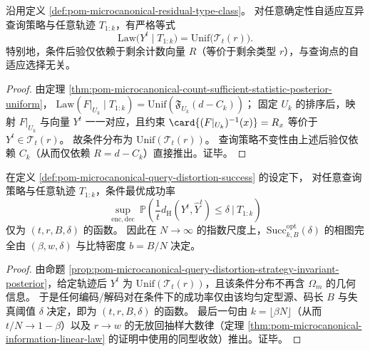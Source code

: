 \begin{proposition}\label{prop:pom-microcanonical-query-distortion-strategy-invariant-posterior}
沿用定义 \ref{def:pom-microcanonical-residual-type-class}。
对任意确定性自适应互异查询策略与任意轨迹 \(T_{1:k}\)，有严格等式
\[
\mathrm{Law}\bigl(Y^t\mid T_{1:k}\bigr)=\mathrm{Unif}\bigl(\mathcal{T}_t(r)\bigr).
\]
特别地，条件后验仅依赖于剩余计数向量 \(R\)（等价于剩余类型 \(r\)），与查询点的自适应选择无关。
\end{proposition}
\begin{proof}
由定理 \ref{thm:pom-microcanonical-count-sufficient-statistic-posterior-uniform}，
\(
\mathrm{Law}(F|_{U_k}\mid T_{1:k})=\mathrm{Unif}(\mathfrak{F}_{U_k}(d-C_k))
\)；
固定 \(U_k\) 的排序后，映射 \(F|_{U_k}\) 与向量 \(Y^t\) 一一对应，且约束 \(\card{(F|_{U_k})^{-1}(x)}=R_x\) 等价于 \(Y^t\in\mathcal{T}_t(r)\)。
故条件分布为 \(\mathrm{Unif}(\mathcal{T}_t(r))\)。
查询策略不变性由上述后验仅依赖 \(C_k\)（从而仅依赖 \(R=d-C_k\)）直接推出。证毕。
\end{proof}

\begin{proposition}[查询—失真任务的充分统计]\label{prop:pom-microcanonical-query-distortion-sufficient-statistic}
在定义 \ref{def:pom-microcanonical-query-distortion-success} 的设定下，
对任意查询策略与任意轨迹 \(T_{1:k}\)，条件最优成功率
\[
\sup_{\mathrm{enc},\mathrm{dec}}\ \mathbb{P}\!\left(\frac{1}{t}d_{\mathrm H}(Y^t,\widehat Y^t)\le \delta\ \Big|\ T_{1:k}\right)
\]
仅为 \((t,r,B,\delta)\) 的函数。
因此在 \(N\to\infty\) 的指数尺度上，\(\mathrm{Succ}^{\mathrm{opt}}_{k,B}(\delta)\) 的相图完全由 \((\beta,w,\delta)\) 与比特密度 \(b=B/N\) 决定。
\end{proposition}
\begin{proof}
由命题 \ref{prop:pom-microcanonical-query-distortion-strategy-invariant-posterior}，给定轨迹后 \(Y^t\) 为 \(\mathrm{Unif}(\mathcal{T}_t(r))\)，且该条件分布不再含 \(\Omega_m\) 的几何信息。
于是任何编码/解码对在条件下的成功率仅由该均匀定型源、码长 \(B\) 与失真阈值 \(\delta\) 决定，即为 \((t,r,B,\delta)\) 的函数。
最后一句由 \(k=\lfloor\beta N\rfloor\)（从而 \(t/N\to 1-\beta\)）以及 \(r\to w\) 的无放回抽样大数律（定理 \ref{thm:pom-microcanonical-information-linear-law} 的证明中使用的同型收敛）推出。证毕。
\end{proof}

